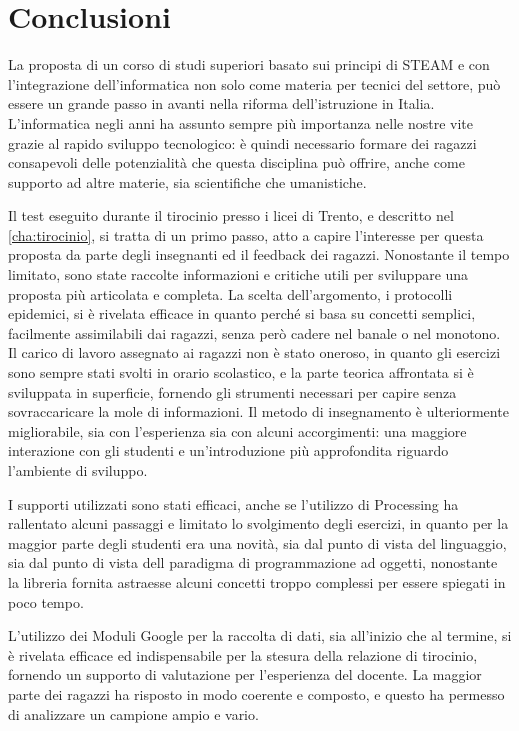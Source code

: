 \newpage
\chapter*{Conclusioni} %
\label{conclusioni}


La proposta di un corso di studi superiori basato sui principi di STEAM e con l'integrazione dell'informatica non solo come materia per tecnici del settore, può essere un grande passo in avanti nella riforma dell'istruzione in Italia. L'informatica negli anni ha assunto sempre più importanza nelle nostre vite grazie al rapido sviluppo tecnologico: è quindi necessario formare dei ragazzi consapevoli delle potenzialità che questa disciplina può offrire, anche come supporto ad altre materie, sia scientifiche che umanistiche.

Il test eseguito durante il tirocinio presso i licei di Trento, e descritto nel \autoref{cha:tirocinio}, si tratta di un primo passo, atto a capire l'interesse per questa proposta da parte degli insegnanti ed il feedback dei ragazzi. Nonostante il tempo limitato, sono state raccolte informazioni e critiche utili per sviluppare una proposta più articolata e completa. La scelta dell'argomento, i protocolli epidemici, si è rivelata efficace in quanto perché si basa su concetti semplici, facilmente assimilabili dai ragazzi, senza però cadere nel banale o nel monotono. Il carico di lavoro assegnato ai ragazzi non è stato oneroso, in quanto gli esercizi sono sempre stati svolti in orario scolastico, e la parte teorica affrontata si è sviluppata in superficie, fornendo gli strumenti necessari per capire senza sovraccaricare la mole di informazioni. Il metodo di insegnamento è ulteriormente migliorabile, sia con l'esperienza sia con alcuni accorgimenti: una maggiore interazione con gli studenti e un'introduzione più approfondita riguardo l'ambiente di sviluppo.

I supporti utilizzati sono stati efficaci, anche se l'utilizzo di Processing ha rallentato alcuni passaggi e limitato lo svolgimento degli esercizi, in quanto per la maggior parte degli studenti era una novità, sia dal punto di vista del linguaggio, sia dal punto di vista dell paradigma di programmazione ad oggetti, nonostante la libreria fornita astraesse alcuni concetti troppo complessi per essere spiegati in poco tempo. 

L'utilizzo dei Moduli Google per la raccolta di dati, sia all'inizio che al termine, si è rivelata efficace ed indispensabile per la stesura della relazione di tirocinio, fornendo un supporto di valutazione per l'esperienza del docente. La maggior parte dei ragazzi ha risposto in modo coerente e composto, e questo ha permesso di analizzare un campione ampio e vario. 

